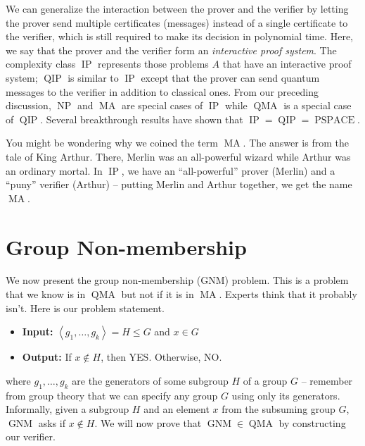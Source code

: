 \documentclass[11pt]{article}
\newcommand{\np}{\operatorname{NP}}
\newcommand{\pspace}{\operatorname{PSPACE}}
\newcommand{\qma}{\operatorname{QMA}}
\newcommand{\ma}{\operatorname{MA}}
\newcommand{\ip}{\operatorname{IP}}
\newcommand{\qip}{\operatorname{QIP}}
\newcommand{\gnm}{\operatorname{GNM}}
\def\fill{   \hfill}
\begin{document}
\fill

\noindent We can generalize the interaction between the prover and the verifier by letting the prover send multiple certificates (messages) instead of a single certificate to the verifier, which is still required to make its decision in polynomial time. Here, we say that the prover and the verifier form an \emph{interactive proof system}. The complexity class $\ip$ represents those problems $A$ that have an interactive proof system; $\qip$ is similar to $\ip$ except that the prover can send quantum messages to the verifier in addition to classical ones. From our preceding discussion, $\np$ and $\ma$ are special cases of $\ip$ while $\qma$ is a special case of $\qip$. Several breakthrough results have shown that $\ip = \qip = \pspace$.

\fill

 You might be wondering why we coined the term $\ma$. The answer is from the tale of King Arthur. There, Merlin was an all-powerful wizard while Arthur was an ordinary mortal. In $\ip$, we have an ``all-powerful'' prover (Merlin) and a ``puny'' verifier (Arthur) -- putting Merlin and Arthur together, we get the name $\ma$.

\section{Group Non-membership}
We now present the group non-membership (GNM) problem. This is a problem that we know is in $\qma$ but not if it is in $\ma$. Experts think that it probably isn't. Here is our problem statement.
\begin{itemize}
\item {\bf Input:} $\left<g_1, \dots, g_k\right> = H \leq G$ and $x \in G$
\item {\bf Output:} If $x \notin H$, then YES. Otherwise, NO.
\end{itemize}
where $g_1, \dots, g_k$ are the generators of some subgroup $H$ of a group $G$ -- remember from group theory that we can specify any group $G$ using only its generators. Informally, given a subgroup $H$ and an element $x$ from the subsuming group $G$, $\gnm$ asks if $x \notin  H$. We will now prove that $\gnm \in \qma$ by constructing our verifier.

\fill
\end{document}
